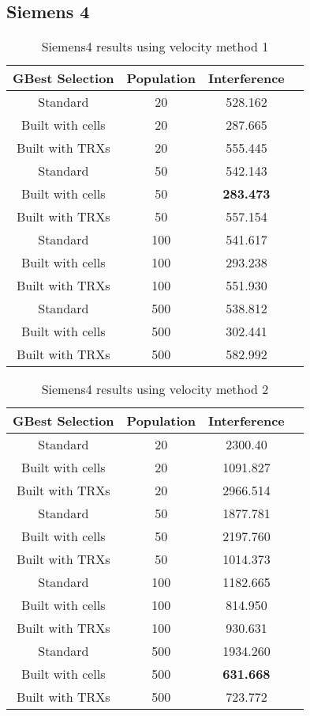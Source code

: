 \subsection{Siemens 4}
\begin{table}[H]
\centering
	\begin{tabular}{| c | c | c | c |}
	\hline
	GBest Selection & Population & Interference\\ \hline
	Standard & 20 & 528.162\\ \hline
	Built with cells & 20 & 287.665\\ \hline
	Built with TRXs & 20 & 555.445\\ \hline
	Standard & 50 & 542.143\\ \hline
	Built with cells & 50 & \textbf{283.473}\\ \hline
	Built with TRXs & 50 & 557.154\\ \hline
	Standard & 100 & 541.617\\ \hline
	Built with cells & 100 & 293.238\\ \hline
	Built with TRXs & 100 & 551.930\\ \hline
	Standard & 500 & 538.812\\ \hline
	Built with cells & 500 & 302.441\\ \hline
	Built with TRXs & 500 & 582.992\\ \hline
	\end{tabular}
\caption{Siemens4 results using velocity method 1}
\label{tab:siem4m1}
\end{table}
\begin{table}[H]
\centering
	\begin{tabular}{| c | c | c | c |}
	\hline
	GBest Selection & Population & Interference\\ \hline
	Standard & 20 & 2300.40\\ \hline
	Built with cells & 20 & 1091.827\\ \hline
	Built with TRXs & 20 & 2966.514\\ \hline
	Standard & 50 & 1877.781\\ \hline
	Built with cells & 50 & 2197.760\\ \hline
	Built with TRXs & 50 & 1014.373\\ \hline
	Standard & 100 & 1182.665\\ \hline
	Built with cells & 100 & 814.950\\ \hline
	Built with TRXs & 100 & 930.631\\ \hline
	Standard & 500 & 1934.260\\ \hline
	Built with cells & 500 & \textbf{631.668}\\ \hline
	Built with TRXs & 500 & 723.772\\ \hline
	\end{tabular}
\caption{Siemens4 results using velocity method 2}
\label{tab:siem4m2}
\end{table}
